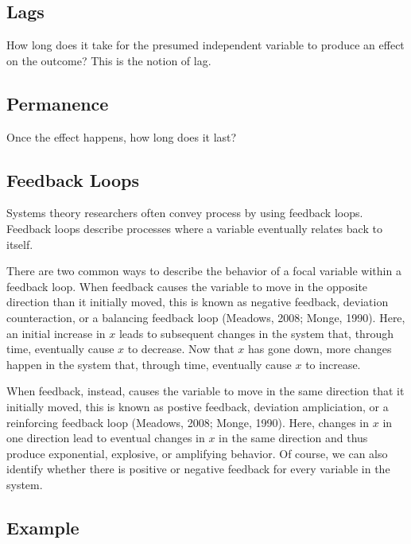 \documentclass[english,,man]{apa6}
\theoremstyle{definition}
\theoremstyle{definition}
\theoremstyle{definition}
\theoremstyle{remark}
\begin{document}
\hypertarget{lags}{%
\subsection{Lags}\label{lags}}

How long does it take for the presumed independent variable to produce
an effect on the outcome? This is the notion of lag.

\hypertarget{permanence}{%
\subsection{Permanence}\label{permanence}}

Once the effect happens, how long does it last?

\hypertarget{feedback-loops}{%
\subsection{Feedback Loops}\label{feedback-loops}}

Systems theory researchers often convey process by using feedback loops.
Feedback loops describe processes where a variable eventually relates
back to itself.

There are two common ways to describe the behavior of a focal variable
within a feedback loop. When feedback causes the variable to move in the
opposite direction than it initially moved, this is known as negative
feedback, deviation counteraction, or a balancing feedback loop
(Meadows, 2008; Monge, 1990). Here, an initial increase in \(x\) leads
to subsequent changes in the system that, through time, eventually cause
\(x\) to decrease. Now that \(x\) has gone down, more changes happen in
the system that, through time, eventually cause \(x\) to increase.

When feedback, instead, causes the variable to move in the same
direction that it initially moved, this is known as postive feedback,
deviation ampliciation, or a reinforcing feedback loop (Meadows, 2008;
Monge, 1990). Here, changes in \(x\) in one direction lead to eventual
changes in \(x\) in the same direction and thus produce exponential,
explosive, or amplifying behavior. Of course, we can also identify
whether there is positive or negative feedback for every variable in the
system.

\hypertarget{example}{%
\subsection{Example}\label{example}}
\end{document}

